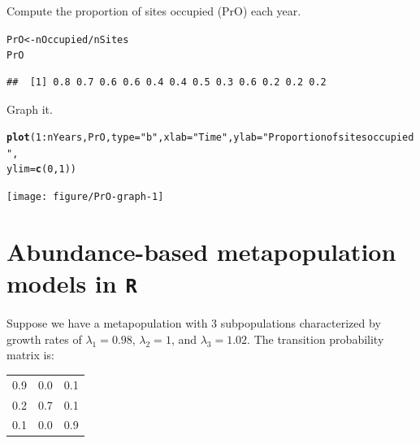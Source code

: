 \documentclass[12pt]{article}\usepackage[]{graphicx}\usepackage[]{color}
\makeatletter
\newcommand{\hlnum}[1]{\textcolor[rgb]{0.686,0.059,0.569}{#1}}%
\newcommand{\hlstr}[1]{\textcolor[rgb]{0.192,0.494,0.8}{#1}}%
\newcommand{\hlopt}[1]{\textcolor[rgb]{0,0,0}{#1}}%
\newcommand{\hlstd}[1]{\textcolor[rgb]{0.345,0.345,0.345}{#1}}%
\newcommand{\hlkwb}[1]{\textcolor[rgb]{0.69,0.353,0.396}{#1}}%
\newcommand{\hlkwc}[1]{\textcolor[rgb]{0.333,0.667,0.333}{#1}}%
\newcommand{\hlkwd}[1]{\textcolor[rgb]{0.737,0.353,0.396}{\textbf{#1}}}%
\newenvironment{kframe}{%
 \def\at@end@of@kframe{}%
 \ifinner\ifhmode%
  \def\at@end@of@kframe{\end{minipage}}%
  \begin{minipage}{\columnwidth}%
 \fi\fi%
 \def\FrameCommand##1{\hskip\@totalleftmargin \hskip-\fboxsep
 \colorbox{shadecolor}{##1}\hskip-\fboxsep
     \hskip-\linewidth \hskip-\@totalleftmargin \hskip\columnwidth}%
 \MakeFramed {\advance\hsize-\width
   \@totalleftmargin\z@ \linewidth\hsize
   \@setminipage}}%
 {\par\unskip\endMakeFramed%
 \at@end@of@kframe}
\newenvironment{knitrout}{}{} %
\makeatother
\begin{document}
\clearpage

Compute the proportion of sites occupied (PrO) each year.
\begin{knitrout}
\color{fgcolor}\begin{kframe}
\begin{alltt}
\hlstd{PrO} \hlkwb{<-} \hlstd{nOccupied} \hlopt{/} \hlstd{nSites}
\hlstd{PrO}
\end{alltt}
\begin{verbatim}
##  [1] 0.8 0.7 0.6 0.6 0.4 0.4 0.5 0.3 0.6 0.2 0.2 0.2
\end{verbatim}
\end{kframe}
\end{knitrout}

Graph it.
\begin{knitrout}
\color{fgcolor}\begin{kframe}
\begin{alltt}
\hlkwd{plot}\hlstd{(}\hlnum{1}\hlopt{:}\hlstd{nYears, PrO,} \hlkwc{type}\hlstd{=}\hlstr{"b"}\hlstd{,} \hlkwc{xlab}\hlstd{=}\hlstr{"Time"}\hlstd{,} \hlkwc{ylab}\hlstd{=}\hlstr{"Proportion of sites occupied"}\hlstd{,}
     \hlkwc{ylim}\hlstd{=}\hlkwd{c}\hlstd{(}\hlnum{0}\hlstd{,} \hlnum{1}\hlstd{))}
\end{alltt}
\end{kframe}
\texttt{[image: figure/PrO-graph-1]} 
\end{knitrout}


\clearpage

\section*{Abundance-based metapopulation models in \texttt{R}}

Suppose we have a metapopulation with 3 subpopulations characterized
by growth rates of $\lambda_1=0.98$, $\lambda_2=1$, and
$\lambda_3=1.02$. The transition probability matrix is:

\begin{table}[h!]
  \centering
  \begin{tabular}{ccc}
    \hline
    0.9 & 0.0 & 0.1 \\
    0.2 & 0.7 & 0.1 \\
    0.1 & 0.0 & 0.9 \\
    \hline
  \end{tabular}
\end{table}
\end{document}
